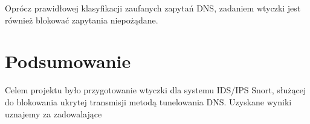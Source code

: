 \documentclass{eiti-raport}
\begin{document}
Oprócz prawidłowej klasyfikacji zaufanych zapytań DNS, zadaniem wtyczki jest również blokować zapytania niepożądane. 



\section{Podsumowanie} \label{sec:summary}
Celem projektu było przygotowanie wtyczki dla systemu IDS/IPS Snort, służącej do blokowania ukrytej transmisji metodą tunelowania DNS. Uzyskane wyniki uznajemy za zadowalające
\end{document}
